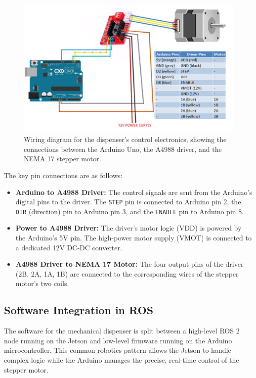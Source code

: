 \begin{figure}[h!]
    \centering
    \includegraphics[width=\linewidth]{figures/stepper.png}
    \caption[Wiring diagram for the dispenser's control electronics.]%
    {Wiring diagram for the dispenser's control electronics, showing the connections between the Arduino Uno, the A4988 driver, and the NEMA 17 stepper motor.}
    \label{fig:stepper_wiring}
\end{figure}

The key pin connections are as follows:
\begin{itemize}
    \item \textbf{Arduino to A4988 Driver:} The control signals are sent from the Arduino's digital pins to the driver. The \texttt{STEP} pin is connected to Arduino pin 2, the \texttt{DIR} (direction) pin to Arduino pin 3, and the \texttt{ENABLE} pin to Arduino pin 8.
    \item \textbf{Power to A4988 Driver:} The driver's motor logic (VDD) is powered by the Arduino's 5V pin. The high-power motor supply (VMOT) is connected to a dedicated 12V DC-DC converter.
    \item \textbf{A4988 Driver to NEMA 17 Motor:} The four output pins of the driver (2B, 2A, 1A, 1B) are connected to the corresponding wires of the stepper motor's two coils.
\end{itemize}

\subsection{Software Integration in ROS}
\label{ssec:dispenser_software}
The software for the mechanical dispenser is split between a high-level ROS 2 node running on the Jetson and low-level firmware running on the Arduino microcontroller. This common robotics pattern allows the Jetson to handle complex logic while the Arduino manages the precise, real-time control of the stepper motor.

